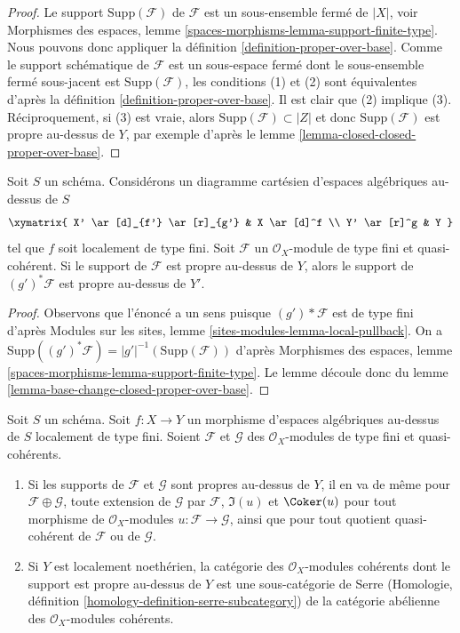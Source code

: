 \begin{proof}
Le support $\text{Supp}(\mathcal{F})$ de $\mathcal{F}$ est un sous-ensemble fermé
de $|X|$, voir Morphismes des espaces, lemme
\ref{spaces-morphisms-lemma-support-finite-type}.
Nous pouvons donc appliquer la définition \ref{definition-proper-over-base}.
Comme le support schématique de $\mathcal{F}$ est un sous-espace fermé
dont le sous-ensemble fermé sous-jacent est $\text{Supp}(\mathcal{F})$,
les conditions (1) et (2) sont équivalentes d'après la
définition \ref{definition-proper-over-base}.
Il est clair que (2) implique (3).
Réciproquement, si (3) est vraie, alors
$\text{Supp}(\mathcal{F}) \subset |Z|$
et donc $\text{Supp}(\mathcal{F})$
est propre au-dessus de $Y$, par exemple d'après le
lemme \ref{lemma-closed-closed-proper-over-base}.
\end{proof}

\begin{lemma}
\label{lemma-base-change-module-support-proper-over-base}
Soit $S$ un schéma.
Considérons un diagramme cartésien d'espaces algébriques au-dessus de $S$
$$
\xymatrix{
X' \ar[d]_{f'} \ar[r]_{g'} & X \ar[d]^f \\
Y' \ar[r]^g & Y
}
$$
tel que $f$ soit localement de type fini. Soit $\mathcal{F}$ un
$\mathcal{O}_X$-module de type fini et quasi-cohérent.
Si le support de $\mathcal{F}$ est propre au-dessus de $Y$, alors
le support de $(g')^*\mathcal{F}$ est propre au-dessus de $Y'$.
\end{lemma}

\begin{proof}
Observons que l'énoncé a un sens puisque
$(g')*\mathcal{F}$ est de type fini d'après
Modules sur les sites, lemme \ref{sites-modules-lemma-local-pullback}.
On a $\text{Supp}((g')^*\mathcal{F}) = |g'|^{-1}(\text{Supp}(\mathcal{F}))$
d'après Morphismes des espaces, lemme \ref{spaces-morphisms-lemma-support-finite-type}.
Le lemme découle donc du
lemme \ref{lemma-base-change-closed-proper-over-base}.
\end{proof}

\begin{lemma}
\label{lemma-cat-module-support-proper-over-base}
Soit $S$ un schéma.
Soit $f : X \to Y$ un morphisme d'espaces algébriques au-dessus de $S$
localement de type fini. Soient $\mathcal{F}$ et $\mathcal{G}$
des $\mathcal{O}_X$-modules de type fini et quasi-cohérents.
\begin{enumerate}
\item Si les supports de $\mathcal{F}$ et $\mathcal{G}$
sont propres au-dessus de $Y$, il en va de même
pour $\mathcal{F} \oplus \mathcal{G}$, toute extension
de $\mathcal{G}$ par $\mathcal{F}$, $\Im(u)$ et $\Coker(u)$
pour tout morphisme de $\mathcal{O}_X$-modules $u : \mathcal{F} \to \mathcal{G}$,
ainsi que pour tout quotient quasi-cohérent de $\mathcal{F}$ ou de $\mathcal{G}$.
\item Si $Y$ est localement noethérien, la catégorie des
$\mathcal{O}_X$-modules cohérents dont le support est propre au-dessus de
$Y$ est une sous-catégorie de Serre (Homologie, définition
\ref{homology-definition-serre-subcategory})
de la catégorie abélienne des $\mathcal{O}_X$-modules cohérents.
\end{enumerate}
\end{lemma}

